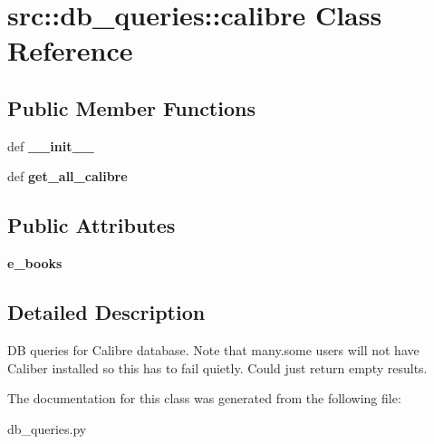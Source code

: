 \hypertarget{classsrc_1_1db__queries_1_1calibre}{
\section{src::db\_\-queries::calibre Class Reference}
\label{classsrc_1_1db__queries_1_1calibre}
}
\subsection*{Public Member Functions}
\begin{DoxyCompactItemize}
\item 
\hypertarget{classsrc_1_1db__queries_1_1calibre_a06d109b3f1a199aeb3b0a8cae90a3842}{
def {\bfseries \_\-\_\-init\_\-\_\-}}
\label{classsrc_1_1db__queries_1_1calibre_a06d109b3f1a199aeb3b0a8cae90a3842}

\item 
\hypertarget{classsrc_1_1db__queries_1_1calibre_a0a5f7b0b7603704828266d2f563fb603}{
def {\bfseries get\_\-all\_\-calibre}}
\label{classsrc_1_1db__queries_1_1calibre_a0a5f7b0b7603704828266d2f563fb603}

\end{DoxyCompactItemize}
\subsection*{Public Attributes}
\begin{DoxyCompactItemize}
\item 
\hypertarget{classsrc_1_1db__queries_1_1calibre_ae75234df6b0ffc9f126ed3e57be9225c}{
{\bfseries e\_\-books}}
\label{classsrc_1_1db__queries_1_1calibre_ae75234df6b0ffc9f126ed3e57be9225c}

\end{DoxyCompactItemize}


\subsection{Detailed Description}
\begin{DoxyVerb}
DB queries for Calibre database.  Note that many.some users will not 
have Caliber installed so this has to fail quietly.  Could just return
empty results.

\end{DoxyVerb}
 

The documentation for this class was generated from the following file:\begin{DoxyCompactItemize}
\item 
db\_\-queries.py\end{DoxyCompactItemize}
